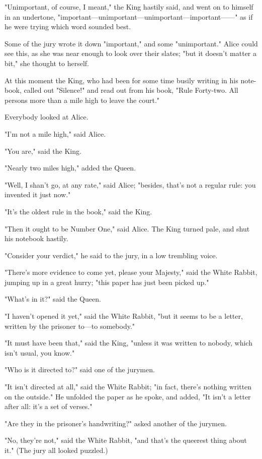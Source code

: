 "Unimportant, of course, I meant," the King hastily said, and went on to himself in an undertone, "important—unimportant—unimportant—important——" as if he were trying which word sounded best.

Some of the jury wrote it down "important," and some "unimportant." Alice could see this, as she was near enough to look over their slates; "but it doesn't matter a bit," she thought to herself.

​At this moment the King, who had been for some time busily writing in his note-book, called out "Silence!" and read out from his book, "Rule Forty-two. All persons more than a mile high to leave the court."

Everybody looked at Alice.

"I'm not a mile high," said Alice.

"You are," said the King.

"Nearly two miles high," added the Queen.

"Well, I shan't go, at any rate," said Alice; "besides, that's not a regular rule: you invented it just now."

"It's the oldest rule in the book," said the King.

"Then it ought to be Number One," said Alice. The King turned pale, and shut his notebook hastily.

"Consider your verdict," he said to the jury, in a low trembling voice.

"There's more evidence to come yet, please your Majesty," said the White Rabbit, jumping up in a great hurry; "this paper has just been picked up."

​"What's in it?" said the Queen.

"I haven't opened it yet," said the White Rabbit, "but it seems to be a letter, written by the prisoner to—to somebody."

"It must have been that," said the King, "unless it was written to nobody, which isn't usual, you know."

"Who is it directed to?" said one of the jurymen.

"It isn't directed at all," said the White Rabbit; "in fact, there's nothing written on the outside." He unfolded the paper as he spoke, and added, "It isn't a letter after all: it's a set of verses."

"Are they in the prisoner's handwriting?" asked another of the jurymen.

"No, they're not," said the White Rabbit, "and that's the queerest thing about it." (The jury all looked puzzled.)

